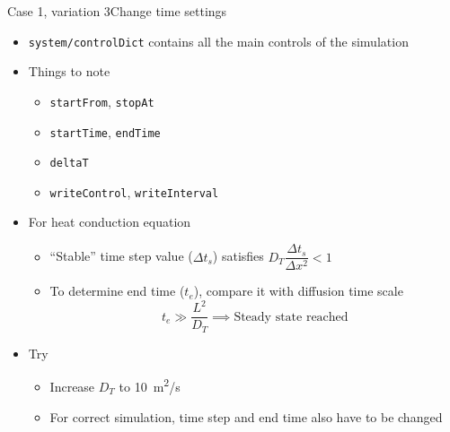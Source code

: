 \begin{frame}{Case 1, variation 3}{Change time settings}
    \begin{itemize}
        \setitemsep{1em}
        \item \texttt{system/controlDict} contains all the main controls of the simulation
        \item Things to note
        \begin{itemize}
            \item \texttt{startFrom}, \texttt{stopAt}
            \item \texttt{startTime}, \texttt{endTime}
            \item \texttt{deltaT}
            \item \texttt{writeControl}, \texttt{writeInterval}
        \end{itemize}
        \item For heat conduction equation
        \begin{itemize}
            \item ``Stable'' time step value ($\Delta t_s$) satisfies $D_T \dfrac{\Delta t_s}{\Delta x^2} < 1$
            \item To determine end time ($t_e$), compare it with diffusion time scale
            \begin{equation*}
                t_e \gg \frac{L^2}{D_T} \implies \text{Steady state reached}
            \end{equation*}
        \end{itemize}
        \item Try
        \begin{itemize}
            \item Increase $D_T$ to \qty{10}{m^2/s}
            \item For correct simulation, time step and end time also have to be changed
        \end{itemize}
    \end{itemize}
\end{frame}

